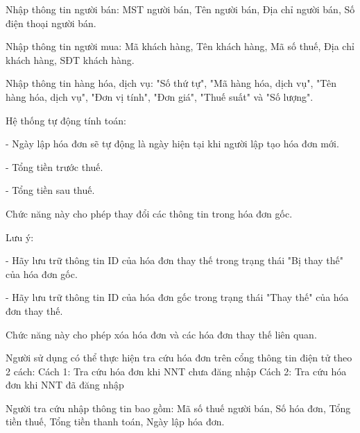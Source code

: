 

Nhập thông tin người bán: MST người bán, Tên người bán, Địa chỉ người bán, Số điện thoại người bán.

Nhập thông tin người mua: Mã khách hàng, Tên khách hàng, Mã số thuế, Địa chỉ khách hàng, SĐT khách hàng.

Nhập thông tin hàng hóa, dịch vụ: "Số thứ tự", "Mã hàng hóa, dịch vụ", "Tên hàng hóa, dịch vụ", "Đơn vị tính", "Đơn giá", "Thuế suất" và "Số lượng".

Hệ thống tự động tính toán:

- Ngày lập hóa đơn sẽ tự động là ngày hiện tại khi người lập tạo hóa đơn mới.

- Tổng tiền trước thuế.

- Tổng tiền sau thuế.


Chức năng này cho phép thay đổi các thông tin trong hóa đơn gốc.

Lưu ý:

- Hãy lưu trữ thông tin ID của hóa đơn thay thế trong trạng thái "Bị thay thế" của hóa đơn gốc.

- Hãy lưu trữ thông tin ID của hóa đơn gốc trong trạng thái "Thay thế" của hóa đơn thay thế.


Chức năng này cho phép xóa hóa đơn và các hóa đơn thay thế liên quan.


Người sử dụng có thể thực hiện tra cứu hóa đơn trên cổng thông tin điện tử theo 2 cách:
Cách 1: Tra cứu hóa đơn khi NNT chưa đăng nhập
Cách 2: Tra cứu hóa đơn khi NNT đã đăng nhập



Người tra cứu nhập thông tin bao gồm: Mã số thuế người bán, Số hóa đơn, Tổng tiền thuế, Tổng tiền thanh toán, Ngày lập hóa đơn.


